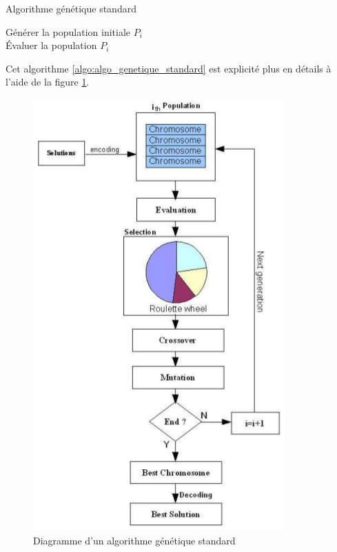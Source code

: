	\begin{algorithm}[H]
 	\caption{Algorithme génétique standard \cite{Goncalves}}
 	\label{algo:algo_genetique_standard}
 	Générer la population initiale $P_{i}$ \\
 	Évaluer la population $P_{i}$ \\
	\end{algorithm}
	
	\vspace*{1cm}
	Cet algorithme \ref{algo:algo_genetique_standard} est explicité plus en détails à l'aide de la figure \ref{fig:genetic_algo_flowchart}.
	
	\begin{figure}[!h]
		\begin{center}
			\includegraphics[scale=.5]{images/genetic_algo_flowchart.png}
			\caption{Diagramme d'un algorithme génétique standard \cite{denny}}
			\label{fig:genetic_algo_flowchart}
		\end{center}
	\end{figure}
	
